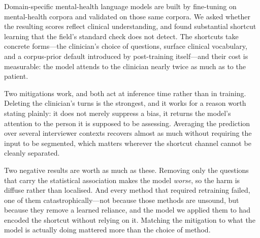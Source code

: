 \documentclass{article}
\begin{document}
Domain-specific mental-health language models are built by fine-tuning on
mental-health corpora and validated on those same corpora. We asked whether the
resulting scores reflect clinical understanding, and found substantial shortcut
learning that the field's standard check does not detect. The shortcuts take
concrete forms---the clinician's choice of questions, surface clinical
vocabulary, and a corpus-prior default introduced by post-training itself---and
their cost is measurable: the model attends to the clinician nearly twice as
much as to the patient.

Two mitigations work, and both act at inference time rather than in training.
Deleting the clinician's turns is the strongest, and it works for a reason worth
stating plainly: it does not merely suppress a bias, it returns the model's
attention to the person it is supposed to be assessing. Averaging the prediction
over several interviewer contexts recovers almost as much without requiring the
input to be segmented, which matters wherever the shortcut channel cannot be
cleanly separated.

Two negative results are worth as much as these. Removing only the questions
that carry the statistical association makes the model \emph{worse}, so the harm
is diffuse rather than localised. And every method that required retraining
failed, one of them catastrophically---not because those methods are unsound,
but because they remove a learned reliance, and the model we applied them to had
encoded the shortcut without relying on it. Matching the mitigation to what the
model is actually doing mattered more than the choice of method.



\end{document}
